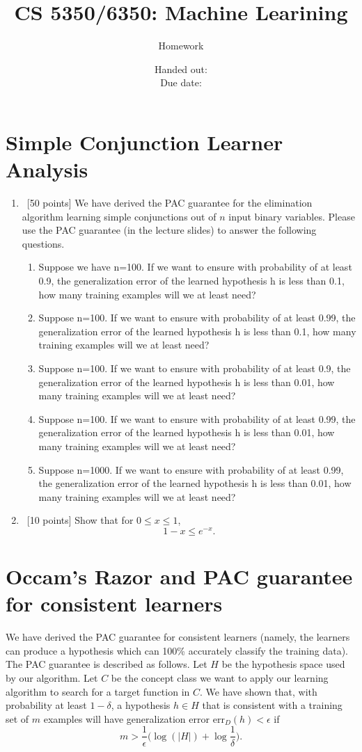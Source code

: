 \documentclass[12pt, fullpage,letterpaper]{article}
\title{CS 5350/6350: Machine Learining \semester}
\author{Homework \assignmentId}
\date{Handed out: \releaseDate\\
  Due date: \dueDate}
\begin{document}
\maketitle





\section{Simple Conjunction Learner Analysis}
\begin{enumerate}
\item~[50 points] We have derived the PAC guarantee for the elimination algorithm learning simple conjunctions out of $n$ input binary variables. Please use the PAC guarantee (in the lecture slides) to answer the following questions. 
\begin{enumerate}
\item Suppose we have n=100. If we want to ensure  with probability of at least 0.9, the generalization error of the learned hypothesis h is less than 0.1, how many training examples will we at least need? 
\item Suppose n=100. If we want to ensure  with probability of at least 0.99, the generalization error of the learned hypothesis h is less than 0.1, how many training examples will we at least need? 
\item Suppose n=100. If we want to ensure  with probability of at least 0.9, the generalization error of the learned hypothesis h is less than 0.01, how many training examples will we at least need? 
\item Suppose n=100. If we want to ensure  with probability of at least 0.99, the generalization error of the learned hypothesis h is less than 0.01, how many training examples will we at least need? 
\item Suppose n=1000. If we want to ensure  with probability of at least 0.99, the generalization error of the learned hypothesis h is less than 0.01, how many training examples will we at least need? 
\end{enumerate}

\item~[10 points] Show that for $0\le x \le 1$, 
\[
1 - x \le e^{-x}.
\]
\end{enumerate}

\section{Occam's Razor and PAC guarantee for consistent learners}
We have derived the PAC guarantee for consistent learners (namely, the learners can produce a hypothesis which can 100\% accurately classify the training data). The PAC guarantee is described as follows. Let $H$ be the hypothesis space used by our algorithm. Let $C$ be the concept class we want to apply our learning algorithm to search for a target function in $C$. We have shown that,  with probability at least $1-\delta$, a hypothesis $h\in H$ that is consistent with a training set of $m$ examples will have generalization error $\mathrm{err}_D(h) < \epsilon$ if 
\[
m > \frac{1}{\epsilon}\big(\log(|H|) + \log\frac{1}{\delta}\big).
\]
\end{document}
